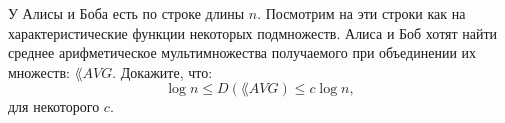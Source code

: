 У Алисы и Боба есть по строке длины $n$. Посмотрим на эти строки как на характеристические функции
некоторых подмножеств. Алиса и Боб хотят найти среднее арифметическое мультимножества получаемого при
объединении их множеств: $\lang{AVG}$. Докажите, что:
$$\log n \le D(\lang{AVG}) \leq c \log n,$$
для некоторого $c$.
